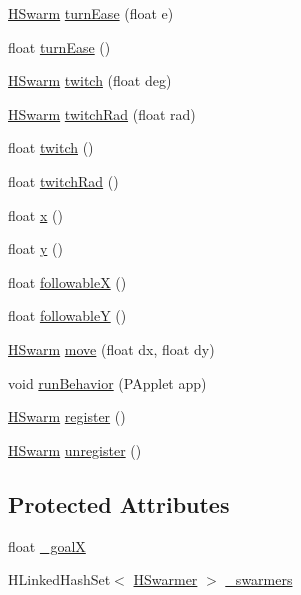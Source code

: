 \begin{DoxyCompactItemize}
\item 
\hyperlink{classhype_1_1behavior_1_1_h_swarm}{H\-Swarm} \hyperlink{classhype_1_1behavior_1_1_h_swarm_a027593b48094315cf76184ad4985577c}{turn\-Ease} (float e)
\item 
float \hyperlink{classhype_1_1behavior_1_1_h_swarm_a178d146ddcea9a3ab975edbe5a9bab35}{turn\-Ease} ()
\item 
\hyperlink{classhype_1_1behavior_1_1_h_swarm}{H\-Swarm} \hyperlink{classhype_1_1behavior_1_1_h_swarm_ad716677386d4651a12dd4919aa0014b3}{twitch} (float deg)
\item 
\hyperlink{classhype_1_1behavior_1_1_h_swarm}{H\-Swarm} \hyperlink{classhype_1_1behavior_1_1_h_swarm_a86b51abc01db6f16dee416eed5cf5009}{twitch\-Rad} (float rad)
\item 
float \hyperlink{classhype_1_1behavior_1_1_h_swarm_ac2e03a345f2060a9b1031a032610a254}{twitch} ()
\item 
float \hyperlink{classhype_1_1behavior_1_1_h_swarm_a1c8e689465a9d5fe631bc82048f5b92f}{twitch\-Rad} ()
\item 
float \hyperlink{classhype_1_1behavior_1_1_h_swarm_ad7060f998f53a175ed64e5df951a58ff}{x} ()
\item 
float \hyperlink{classhype_1_1behavior_1_1_h_swarm_acdec5ccff50dc48e5f8e3f7124821c13}{y} ()
\item 
float \hyperlink{classhype_1_1behavior_1_1_h_swarm_aa74256f0128a72bc6db6c4b881a552ae}{followable\-X} ()
\item 
float \hyperlink{classhype_1_1behavior_1_1_h_swarm_a9415ecbfb5d6c1e69c712e6da56a9d35}{followable\-Y} ()
\item 
\hyperlink{classhype_1_1behavior_1_1_h_swarm}{H\-Swarm} \hyperlink{classhype_1_1behavior_1_1_h_swarm_a8be896c68b2f903177598bd7230a0815}{move} (float dx, float dy)
\item 
void \hyperlink{classhype_1_1behavior_1_1_h_swarm_ac6740ebc12f11d4b601e2b41602852fc}{run\-Behavior} (P\-Applet app)
\item 
\hyperlink{classhype_1_1behavior_1_1_h_swarm}{H\-Swarm} \hyperlink{classhype_1_1behavior_1_1_h_swarm_aed2bec15f13b547c9102186b9d5aeede}{register} ()
\item 
\hyperlink{classhype_1_1behavior_1_1_h_swarm}{H\-Swarm} \hyperlink{classhype_1_1behavior_1_1_h_swarm_a421e4284f278470402c8fab4b262a01f}{unregister} ()
\end{DoxyCompactItemize}
\subsection*{Protected Attributes}
\begin{DoxyCompactItemize}
\item 
float \hyperlink{classhype_1_1behavior_1_1_h_swarm_a82d5808ca78e66936c20d55b4ae140d4}{\-\_\-goal\-X}
\item 
H\-Linked\-Hash\-Set$<$ \hyperlink{interfacehype_1_1interfaces_1_1_h_swarmer}{H\-Swarmer} $>$ \hyperlink{classhype_1_1behavior_1_1_h_swarm_a496a11ba4ddf5ff870c5017682d2e5a9}{\-\_\-swarmers}
\end{DoxyCompactItemize}


